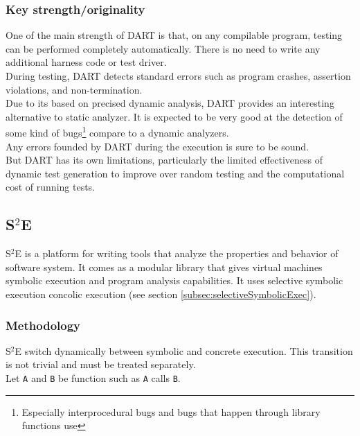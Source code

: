\documentclass[11pt]{IEEEtran}
\begin{document}
	    \subsubsection{Key strength/originality}
	    	One of the main strength of DART is that, on any compilable program, testing can be performed completely automatically. There is no need to write any additional harness code or test driver.\\
	    	During testing, DART detects standard errors such as program crashes, assertion violations, and non-termination.\\
	    	Due to its based on precised dynamic analysis, DART provides an interesting alternative to static analyzer. It is expected to be very good at the detection of some kind of bugs\footnote{Especially  interprocedural bugs and bugs that happen through library functions use} compare to a dynamic analyzers.\\
	    	Any errors founded by DART during the execution is sure to be sound.\\

	    	But DART has its own limitations, particularly the limited effectiveness of dynamic test generation to improve over random testing and the computational cost of running tests.

	\subsection{S$^2$E}
    \label{subsec:S2E}
    	S$^2$E is a platform for writing tools that analyze the properties and behavior of software system. It comes as a modular library that gives virtual machines symbolic execution and program analysis capabilities.\cite{S2EWebSite} It uses selective symbolic execution concolic execution (see section  \ref{subsec:selectiveSymbolicExec}).



    	\subsubsection{Methodology}
    		S$^2$E switch dynamically between symbolic and concrete execution. This transition is not trivial and must be treated separately.\\
    		Let \texttt{A} and \texttt{B} be function such as \texttt{A} calls \texttt{B}.\\
\end{document}
